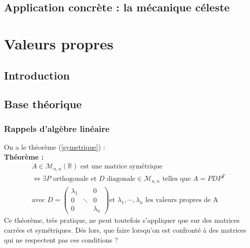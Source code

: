 \documentclass[a4paper,10pt]{report}
\begin{document}
\section{Application concrète : la mécanique céleste}

\chapter{Valeurs propres}
\section{Introduction}

\newpage
\section{Base théorique}
\subsection{Rappels d'algèbre linéaire}
\noindent On a le théorème (\ref{symetrique}) :\\
\textbf{Théorème :}
\begin{equation}
\label{symetrique}
\begin{array}{l}
A \in \mathcal{M}_{n,n}(\mathbb{R}) \text{ est une matrice symétrique} \\
\Leftrightarrow \exists P \text{ orthogonale et } D \text{ diagonale} \in \mathcal{M}_{n,n} \text{ telles que } A=PDP^T \\
\text{avec } D = \left( \begin{array}{ccc} \lambda_1 & & 0 \\ 0 & \ddots & 0 \\ 0 & & \lambda_n \end{array} \right) \text{et } \lambda_1, \cdots, \lambda_n \text{ les valeurs propres de A}
\end{array}
\end{equation}
Ce théorème, très pratique, ne peut toutefois s'appliquer que sur des matrices carrées et symétriques. Dés lors, que faire lorsqu'on est confronté à des matrices qui ne respectent pas ces conditions ?
\end{document}
